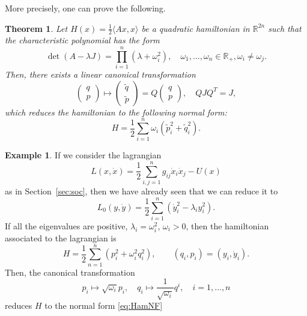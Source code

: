 \documentclass[english,fontsize=11pt,paper=b5]{scrbook}
\numberwithin{equation}{chapter}
\newtheorem{theorem}{Theorem}[chapter]
\theoremstyle{definition}
\newtheorem{example}{Example}[chapter]
\begin{document}
      More precisely, one can prove the following.
      \begin{theorem}
        Let $H(x) = \frac12\langle Ax,x \rangle$ be a quadratic hamiltonian in $\mathbb{R}^{2n}$
        such that the characteristic polynomial has the form
        \begin{equation}
          \det(A-\lambda J) = \prod_{i=1}^n(\lambda + \omega_i^2), \quad \omega_1, \ldots, \omega_n \in \mathbb{R}_+, \omega_i\neq\omega_j.
        \end{equation}
        Then, there exists a linear canonical transformation
        \begin{equation}
          \begin{pmatrix}
            q \\ p
          \end{pmatrix}
          \mapsto
          \begin{pmatrix}
            \widetilde q \\ \widetilde p
          \end{pmatrix}
          = Q
          \begin{pmatrix}
            q \\ p
          \end{pmatrix},
          \quad QJQ^T = J,
        \end{equation}
        which reduces the hamiltonian to the following \emph{normal form}:
        \begin{equation}\label{eq:HamNF}
          H = \frac12 \sum_{i=1}^n \omega_i(\widetilde p_i^2 + \widetilde q_i^2).
        \end{equation}
      \end{theorem}

      \begin{example}
        If we consider the lagrangian
        \begin{equation}
          L(x,\dot x) = \frac12 \sum_{i,j=1}^n g_{ij}\dot x_i \dot x_j - U(x)
        \end{equation}
        as in Section~\ref{sec:soc}, then we have already seen that we can reduce it to
        \begin{equation}
          L_0(y,\dot y) = \frac12 \sum_{i=1}^n(\dot y_i^2 - \lambda_i y_i^2).
        \end{equation}
        If all the eigenvalues are positive, $\lambda_i = \omega_i^2$, $\omega_i > 0$, then the hamiltonian associated to the lagrangian is
        \begin{equation}
          H = \frac12 \sum_{n=1}^n(p_i^2 + \omega_i^2 q_i^2), \qquad (q_i, p_i) = (y_i, \dot y_i).
        \end{equation}
        Then, the canonical transformation
        \begin{equation}
          p_i \mapsto \sqrt{\omega_i}p_i, \quad q_i \mapsto \frac{1}{\sqrt{\omega_i}}q^i, \quad i=1,\ldots,n
        \end{equation}
        reduces $H$ to the normal form \eqref{eq:HamNF}
      \end{example}
\end{document}
